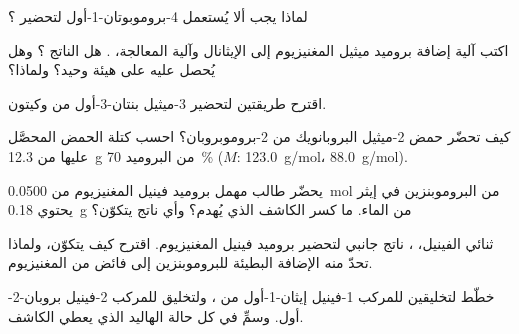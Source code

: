 \begin{exercise}[$\star$]\label{exo:b1:organomagnesium:4}
لماذا يجب ألا يُستعمل 4-بروموبوتان-1-أول لتحضير ؟
\end{exercise}

\begin{exercise}[$\star\star$]\label{exo:b1:organomagnesium:5}
اكتب آلية إضافة بروميد ميثيل المغنيزيوم إلى الإيثانال
وآلية المعالجة، . هل الناتج ؟ وهل
يُحصل عليه على هيئة  وحيد؟ ولماذا؟
\end{exercise}

\begin{exercise}[$\star\star$]\label{exo:b1:organomagnesium:6}
اقترح طريقتين لتحضير 3-ميثيل بنتان-3-أول من 
وكيتون.
\end{exercise}

\begin{exercise}[$\star\star$]\label{exo:b1:organomagnesium:7}
كيف تحضّر حمض 2-ميثيل البروبانويك من 2-بروموبروبان؟ احسب
كتلة الحمض المحصَّل عليها من \qty{12.3}{g} من البروميد 
\qty{70}{\percent} ($M$:  \qty{123.0}{g/mol}، 
\qty{88.0}{g/mol}).
\end{exercise}

\begin{exercise}[$\star\star$]\label{exo:b1:organomagnesium:8}
يحضّر طالب مهمل بروميد فينيل المغنيزيوم من
\qty{0.0500}{mol} من البروموبنزين في إيثر يحتوي \qty{0.18}{g} من
الماء. ما كسر الكاشف الذي يُهدم؟ وأي ناتج يتكوّن؟
\end{exercise}

\begin{exercise}[$\star\star$]\label{exo:b1:organomagnesium:9}
ثنائي الفينيل، ، ناتج جانبي لتحضير
بروميد فينيل المغنيزيوم. اقترح كيف يتكوّن، ولماذا تحدّ منه الإضافة البطيئة
للبروموبنزين إلى فائض من المغنيزيوم.
\end{exercise}

\begin{exercise}[$\star\star\star$]\label{exo:b1:organomagnesium:10}
خطّط لتخليقين للمركب 1-فينيل إيثان-1-أول من ، ولتخليق
للمركب 2-فينيل بروبان-2-أول. وسمِّ في كل حالة الهاليد الذي يعطي
الكاشف.
\end{exercise}

